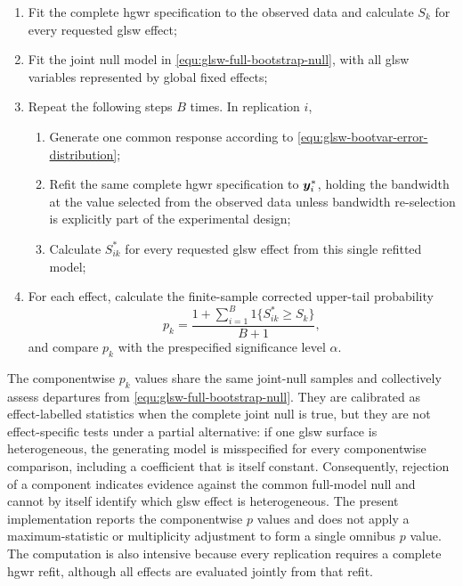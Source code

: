 \documentclass[times]{interact}
\theoremstyle{plain}%
\theoremstyle{definition}
\theoremstyle{remark}
\begin{document}
\begin{enumerate}[label=\textbf{Step \arabic*.}, left=0.5em, itemindent=2em]
  \item Fit the complete \gls{hgwr} specification to the observed data and calculate $S_k$ for every requested \gls{glsw} effect;
  \item Fit the joint null model in \autoref{equ:glsw-full-bootstrap-null}, with all \gls{glsw} variables represented by global fixed effects;
  \item Repeat the following steps $B$ times. In replication $i$,
  \begin{enumerate}
    \item Generate one common response according to \autoref{equ:glsw-bootvar-error-distribution};
    \item Refit the same complete \gls{hgwr} specification to $\bm{y}^{*}_{i}$, holding the bandwidth at the value selected from the observed data unless bandwidth re-selection is explicitly part of the experimental design;
    \item Calculate $S^{*}_{ik}$ for every requested \gls{glsw} effect from this single refitted model;
  \end{enumerate}
  \item For each effect, calculate the finite-sample corrected upper-tail probability
  \begin{equation}\label{equ:glsw-bootvar-pvalue}
    p_k = \frac{1+\sum_{i=1}^B 1\{S^*_{ik} \geq S_k\}}{B+1},
  \end{equation}
  and compare $p_k$ with the prespecified significance level $\alpha$.
\end{enumerate}

The componentwise $p_k$ values share the same joint-null samples and collectively assess departures from \autoref{equ:glsw-full-bootstrap-null}.
They are calibrated as effect-labelled statistics when the complete joint null is true, but they are not effect-specific tests under a partial alternative: if one \gls{glsw} surface is heterogeneous, the generating model is misspecified for every componentwise comparison, including a coefficient that is itself constant.
Consequently, rejection of a component indicates evidence against the common full-model null and cannot by itself identify which \gls{glsw} effect is heterogeneous.
The present implementation reports the componentwise $p$ values and does not apply a maximum-statistic or multiplicity adjustment to form a single omnibus $p$ value.
The computation is also intensive because every replication requires a complete \gls{hgwr} refit, although all effects are evaluated jointly from that refit.
\end{document}
